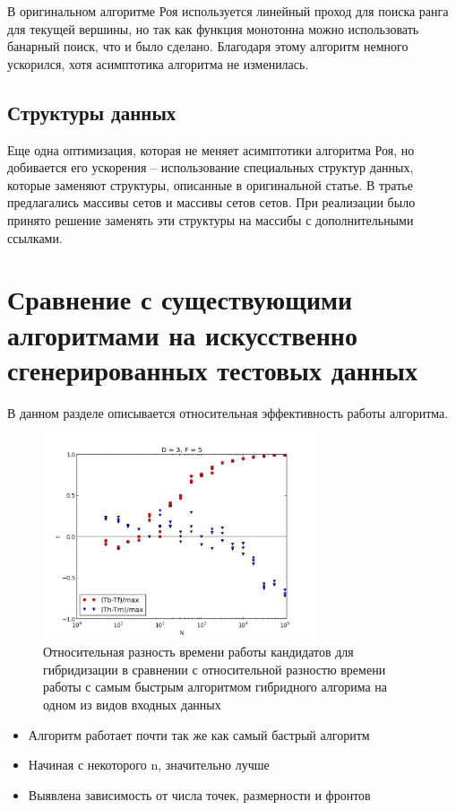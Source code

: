 В оригинальном алгоритме Роя используется линейный проход для поиска ранга для текущей вершины, но так как функция
монотонна можно использовать банарный поиск, что и было сделано. Благодаря этому алгоритм немного ускорился, хотя
асимптотика алгоритма не изменилась.

\subsection{Структуры данных}

Еще одна оптимизация, которая не меняет асимптотики алгоритма Роя, но добивается его ускорения -- использование
специальных структур данных, которые заменяют структуры, описанные в оригинальной статье.
В тратье предлагались массивы сетов и массивы сетов сетов. При реализации было принято решение заменять эти структуры
на массибы с дополнительными ссылками.

\section{Сравнение с существующими алгоритмами на искусственно сгенерированных тестовых данных}

В данном разделе описывается относительная эффективность работы алгоритма.

\begin{figure}
\begin{center}
\includegraphics[width=8cm]{pic/result.png}
\caption{Относительная разность времени работы кандидатов для гибридизации в сравнении с относительной разностю времени работы с самым быстрым алгоритмом гибридного алгорима на одном из видов входных данных}
\label{experiment}
\end{center} %
\end{figure}

\begin{itemize}
\item {Алгоритм работает почти так же как самый бастрый алгоритм}
\item {Начиная с некоторого n, значительно лучше}
\item {Выявлена зависимость от числа точек, размерности и фронтов}
\end{itemize}

